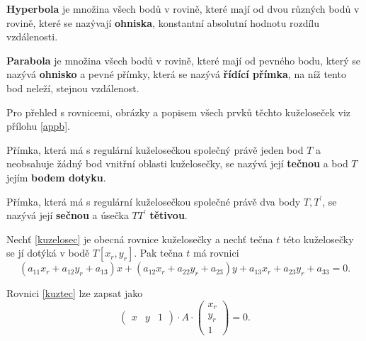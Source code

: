 \begin{definition}
\textbf{Hyperbola} je množina všech bodů v rovině, které mají od dvou různých
bodů v rovině, které se nazývají \textbf{ohniska}, konstantní absolutní
hodnotu rozdílu vzdálenosti.
\end{definition}

\begin{definition}
\textbf{Parabola} je množina všech bodů v rovině, které mají od pevného bodu, který
se nazývá \textbf{ohnisko} a pevné přímky, která se nazývá \textbf{řídící přímka},
na níž tento bod neleží, stejnou vzdálenost.
\end{definition}

\begin{pozn}
    Pro přehled s rovnicemi, obrázky a popisem všech prvků těchto kuželoseček
    viz přílohu \ref{appb}.
\end{pozn}

\begin{definition}
    Přímka, která má s regulární kuželosečkou společný právě jeden bod $T$ a neobsahuje
    žádný bod vnitřní oblasti kuželosečky, se nazývá její \textbf{tečnou} a bod
    $T$ jejím \textbf{bodem dotyku}.
\end{definition}

\begin{definition}
Přímka, která má s regulární kuželosečkou společné právě dva body $T,T^\prime$, se
nazývá její \textbf{sečnou} a úsečka $TT^\prime$ \textbf{tětivou}.
\end{definition}

\begin{veta}
    Nechť \ref{kuzelosec} je obecná rovnice kuželosečky a nechť tečna $t$ této
    kuželosečky se jí dotýká v bodě $T[x_r, y_r].$ Pak tečna $t$ má rovnici
    \begin{equation}\label{kuztec}
        (a_{11}x_r+a_{12}y_r+a_{13})x+(a_{12}x_r+a_{22}y_r+a_{23})y+a_{13}x_r +
        a_{23}y_r+a_{33}=0.
    \end{equation}
\end{veta}

\begin{pozn}
    Rovnici \ref{kuztec} lze zapsat jako
    $$
    \begin{pmatrix}
        x & y & 1
    \end{pmatrix}\cdot A \cdot \begin{pmatrix}
        x_r \\
        y_r \\
        1
    \end{pmatrix}=0.
    $$
\end{pozn}

